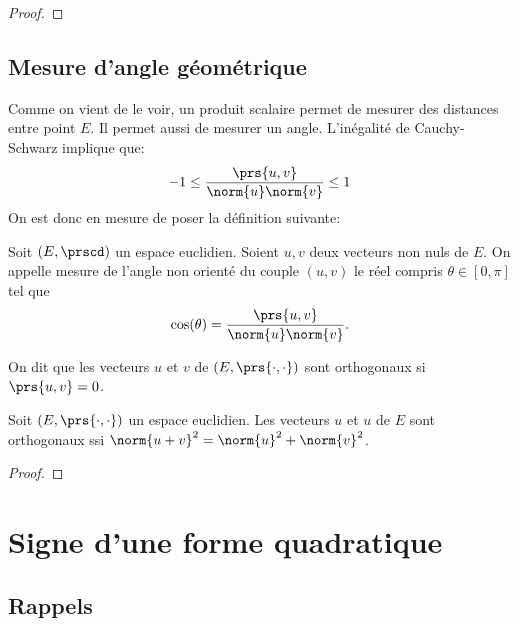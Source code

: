 \begin{proof}
		\pl{\rep{5cm}}
\end{proof}

\sld{\vfill\pagebreak[5]}%
\subsection{Mesure d'angle géométrique}

Comme on vient de le voir, un produit scalaire permet de mesurer des distances entre point $E$. Il permet aussi de mesurer un angle. L'inégalité de Cauchy-Schwarz implique que:
\[
	-1 \leq \frac{\prs{u,v}}{\norm{u} \norm{v}} \leq 1
\]
On est donc en mesure de poser la définition suivante:

\begin{definition}
	Soit $(E,\prscd)$ un espace euclidien. Soient $u,v$ deux vecteurs non nuls de $E$. On appelle mesure de l'angle non orienté du couple $(u,v)$ le réel compris $\theta \in [0,\pi]$ tel que 
	\[
		\cos(\theta) = \frac{\prs{u,v}}{\norm{u}\norm{v}}.
	\]
\end{definition}

\begin{definition}
	On dit que les vecteurs $u$ et $v$ de $(E,\prs{\cdot,\cdot})$ sont orthogonaux si $\prs{u,v} = 0$.
\end{definition}

\begin{proposition}
	 Soit  
	$(E,\prs{\cdot,\cdot})$ un espace euclidien. Les vecteurs $u$ et $u$ de $E$ sont orthogonaux ssi $\norm{u+v}^2= \norm{u}^2 + \norm{v}^2$.
\end{proposition}

\begin{proof}
		\pl{\rep{5cm}}
\end{proof}

\sld{\vfill\pagebreak[5]}%
\section{Signe d'une forme quadratique}

\subsection{Rappels}

